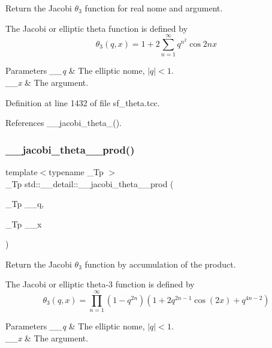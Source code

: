 Return the Jacobi $ \theta_3 $ function for real nome and argument.

The Jacobi or elliptic theta function is defined by \[ \theta_3(q,x) = 1 + 2\sum_{n=1}^{\infty} q^{n^2}\cos{2nx} \]


\begin{DoxyParams}{Parameters}
{\em \+\_\+\+\_\+q} & The elliptic nome, $ |q| < 1 $. \\
\hline
{\em \+\_\+\+\_\+x} & The argument. \\
\hline
\end{DoxyParams}


Definition at line 1432 of file sf\+\_\+theta.\+tcc.



References \+\_\+\+\_\+jacobi\+\_\+theta\+\_().

\mbox{\label{namespacestd_1_1____detail_aef15a9b55f5f4ed8b1f6d6113ad0ef12}} 
\subsubsection{\texorpdfstring{\+\_\+\+\_\+jacobi\+\_\+theta\+\_\+\_\+prod()}{\_\_jacobi\_theta\_3\_prod()}}
{\footnotesize\ttfamily template$<$typename \+\_\+\+Tp $>$ \\
\+\_\+\+Tp std\+::\+\_\+\+\_\+detail\+::\+\_\+\+\_\+jacobi\+\_\+theta\+\_\+\_\+prod (\begin{DoxyParamCaption}\item[{\+\_\+\+Tp}]{\+\_\+\+\_\+q,  }\item[{\+\_\+\+Tp}]{\+\_\+\+\_\+x }\end{DoxyParamCaption})}

Return the Jacobi $ \theta_3 $ function by accumulation of the product.

The Jacobi or elliptic theta-\/3 function is defined by \[ \theta_3(q,x) = \prod_{n=1}^{\infty} (1 - q^{2n})(1 + 2q^{2n-1}\cos(2x) + q^{4n-2}) \]


\begin{DoxyParams}{Parameters}
{\em \+\_\+\+\_\+q} & The elliptic nome, $ |q| < 1 $. \\
\hline
{\em \+\_\+\+\_\+x} & The argument. \\
\hline
\end{DoxyParams}


